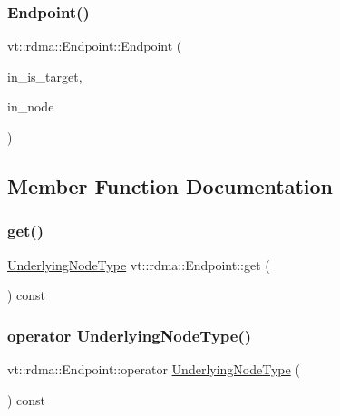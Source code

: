 \subsubsection{\texorpdfstring{Endpoint()}{Endpoint()}}
{\footnotesize\ttfamily vt\+::rdma\+::\+Endpoint\+::\+Endpoint (\begin{DoxyParamCaption}\item[{bool const \&}]{in\+\_\+is\+\_\+target,  }\item[{\hyperlink{namespacevt_1_1rdma_a20d01bc82b95453c162d4b9857a4a78a}{Underlying\+Node\+Type} const \&}]{in\+\_\+node }\end{DoxyParamCaption})\hspace{0.3cm}{\ttfamily [inline]}}



\subsection{Member Function Documentation}
\mbox{\label{structvt_1_1rdma_1_1_endpoint_a1eb7530a3e8dc1c223a3b806922ad734}} 
\subsubsection{\texorpdfstring{get()}{get()}}
{\footnotesize\ttfamily \hyperlink{namespacevt_1_1rdma_a20d01bc82b95453c162d4b9857a4a78a}{Underlying\+Node\+Type} vt\+::rdma\+::\+Endpoint\+::get (\begin{DoxyParamCaption}{ }\end{DoxyParamCaption}) const\hspace{0.3cm}{\ttfamily [inline]}}

\mbox{\label{structvt_1_1rdma_1_1_endpoint_a5ef52e7373b28cecdd240f91eb5b5cc4}} 
\subsubsection{\texorpdfstring{operator Underlying\+Node\+Type()}{operator UnderlyingNodeType()}}
{\footnotesize\ttfamily vt\+::rdma\+::\+Endpoint\+::operator \hyperlink{namespacevt_1_1rdma_a20d01bc82b95453c162d4b9857a4a78a}{Underlying\+Node\+Type} (\begin{DoxyParamCaption}{ }\end{DoxyParamCaption}) const\hspace{0.3cm}{\ttfamily [inline]}}

